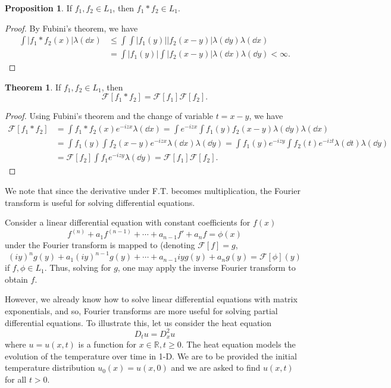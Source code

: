 \documentclass[]{article}
\theoremstyle{definition}
\newtheorem{theorem}{Theorem}
\theoremstyle{definition}
\newtheorem{proposition}{Proposition}[section]
\begin{document}
\begin{proposition}
  If \(f_1, f_2 \in L_1\), then \(f_1 * f_2 \in L_1\).
\end{proposition}
\begin{proof}
  By Fubini's theorem, we have 
  \[\begin{split}
    \int |f_1 * f_2(x)| \lambda(\dd x) & \le \int \int |f_1(y)| |f_2(x - y)| \lambda(\dd y) \lambda(\dd x) \\
     & = \int |f_1(y)| \int |f_2(x - y)| \lambda(\dd x) \lambda(\dd y) < \infty. 
    \end{split}\]
\end{proof}

\begin{theorem}
  If \(f_1, f_2 \in L_1\), then 
  \[\mathcal{F}[f_1 * f_2] = \mathcal{F}[f_1]\mathcal{F}[f_2].\]
\end{theorem}
\begin{proof}
  Using Fubini's theorem and the change of variable \(t = x - y\), we have 
  \[\begin{split}
    \mathcal{F}[f_1 * f_2] & = \int f_1 * f_2(x) e^{-i z x} \lambda(\dd x) 
      = \int e^{-izx}\int f_1(y)f_2(x - y) \lambda(\dd y) \lambda(\dd x) \\
    & = \int f_1(y)  \int f_2(x - y) e^{-izx} \lambda(\dd x) \lambda(\dd y) 
      = \int f_1(y) e^{-izy} \int f_2(t) e^{-izt} \lambda(\dd t) \lambda(\dd y)\\
    & = \mathcal{F}[f_2] \int f_1 e^{-izy} \lambda(\dd y) = \mathcal{F}[f_1] \mathcal{F}[f_2]. 
  \end{split}\]
\end{proof}

We note that since the derivative under F.T. becomes multiplication, the Fourier 
transform is useful for solving differential equations. 

Consider a linear 
differential equation with constant coefficients for \(f(x)\) 
\[f^{(n)} + a_1 f^{(n - 1)} + \cdots + a_{n - 1}f' + a_n f = \phi(x)\]
under the Fourier transform is mapped to (denoting \(\mathcal{F}[f] = g\),
\[(iy)^ng(y) + a_1 (iy)^{n - 1}g(y) + \cdots + a_{n - 1} iy g(y) + a_n g(y) = \mathcal{F}[\phi](y)\]
if \(f, \phi \in L_1\). Thus, solving for \(g\), one may apply the inverse Fourier 
transform to obtain \(f\). 

However, we already know how to solve linear differential equations with matrix exponentials, 
and so, Fourier transforms are more useful for solving partial differential equations.
To illustrate this, let us consider the heat equation
\[D_t u = D_x^2 u\]
where \(u = u(x, t)\) is a function for \(x \in \mathbb{R}, t \ge 0\). The heat 
equation models the evolution of the temperature over time in 1-D. 
We are to be provided the initial temperature distribution \(u_0(x) = u(x, 0)\) 
and we are asked to find \(u(x, t)\) for all \(t > 0\). 
\end{document}
